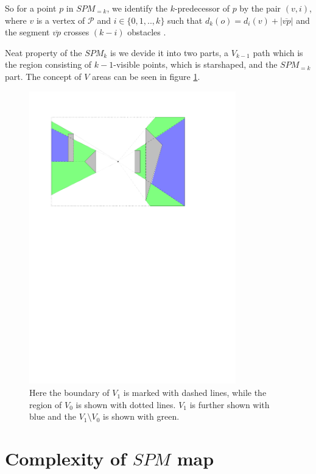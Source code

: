 So for a point $p$ in $SPM_{=k}$, we identify the $k$-predecessor of $p$ by the pair $(v,i)$, where $v$
is a vertex of $\mathcal{P}$ and $i \in \{0,1,..,k\}$ such that $d_k(o) = d_i(v) + |\overline{vp}|$ and the
segment $\overline{vp}$ crosses $(k-i)$ obstacles \cite{HershbergerKS17}.

Neat property of the $SPM_k$ is we devide it into two parts, a $V_{k-1}$ path which is the region consisting of
$k-1$-visible points, which is starshaped, and the $SPM_{=k}$ part. The concept of $V$ areas can be seen in
figure \ref{fig:regions}.

\begin{figure}[H] 
	\centering
	\includegraphics[width=0.8\textwidth]{figures/regions.pdf}
	\caption{Here the boundary of $V_1$ is marked with dashed lines, while the region of $V_0$ is shown with 
	         dotted lines. $V_1$ is further shown with blue and the $V_1 \setminus V_0$ is shown with green.}
	\label{fig:regions} 
\end{figure}

\section{Complexity of $SPM$ map}

